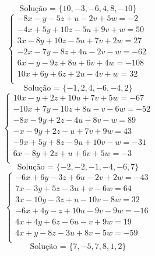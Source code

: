 \documentclass[12pt,oneside,a4paper]{article}
\begin{document}
\begin{equation*}
\text{Solução = }\{10,-3,-6,4,8,-10\}
\end{equation*}
\vspace{\baselineskip}
\begin{equation*}
\begin{cases}
-8x-y-5z+u-2v+5w=-2 \\
-4x+5y+10z-5u+9v+w=50 \\
3x-8y+10z-5u+7v+2w=27 \\
-2x-7y-8z+4u-2v-w=-62 \\
6x-y-9z+8u+6v+4w=-108 \\
10x+6y+6z+2u-4v+w=32 \\
\end{cases}
\end{equation*}
\begin{equation*}
\text{Solução = }\{-1,2,4,-6,-4,2\}
\end{equation*}
\vspace{\baselineskip}
\begin{equation*}
\begin{cases}
10x-y+2z+10u+7v+5w=-67 \\
-10x+7y-10z+8u-v-6w=-52 \\
-8x-9y+2z-4u-8v-w=89 \\
-x-9y+2z-u+7v+9w=43 \\
-9x+5y+8z-9u+10v-w=-31 \\
6x-8y+2z+u+6v+5w=-3 \\
\end{cases}
\end{equation*}
\begin{equation*}
\text{Solução = }\{-2,-2,-1,-4,-6,7\}
\end{equation*}
\vspace{\baselineskip}
\begin{equation*}
\begin{cases}
-6x+6y-3z+6u-2v+2w=-43 \\
7x-3y+5z-3u+v-6w=64 \\
3x-10y-3z+u-10v-8w=32 \\
-6x+4y-z+10u-9v-9w=-16 \\
4x+4y+6z-6u-v+9w=19 \\
4x+y-8z-3u+8v-5w=-59 \\
\end{cases}
\end{equation*}
\begin{equation*}
\text{Solução = }\{7,-5,7,8,1,2\}
\end{equation*}
\end{document}

